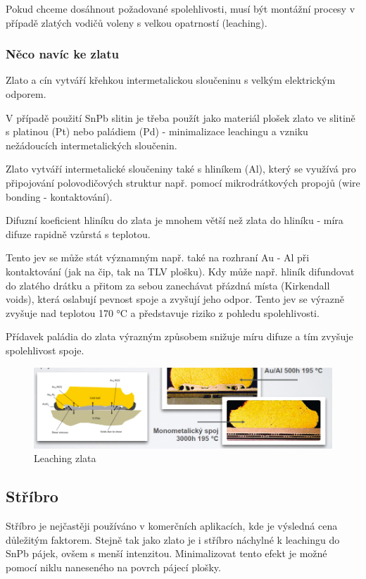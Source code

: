 Pokud chceme dosáhnout požadované spolehlivosti, musí být montážní procesy v případě
zlatých vodičů voleny s velkou opatrností (leaching).
\subsubsection{Něco navíc ke zlatu}
Zlato a cín vytváří křehkou intermetalickou sloučeninu s velkým elektrickým odporem.

V případě použití SnPb slitin je třeba použít jako materiál plošek zlato ve slitině s platinou (Pt) nebo paládiem (Pd) - minimalizace leachingu a vzniku nežádoucích intermetalických
sloučenin.

Zlato vytváří intermetalické sloučeniny také s hliníkem (Al), který se využívá pro připojování polovodičových struktur např. pomocí mikrodrátkových propojů (wire bonding -
kontaktování).

Difuzní koeficient hliníku do zlata je mnohem větší než zlata do hliníku - míra difuze rapidně
vzůrstá s teplotou.

Tento jev se může stát významným např. také na rozhraní Au - Al při kontaktování (jak na
čip, tak na TLV plošku). Kdy může např. hliník difundovat do zlatého drátku a přitom za
sebou zanechávat přázdná místa (Kirkendall voids), která oslabují pevnost spoje a zvyšují jeho odpor. Tento jev se výrazně zvyšuje nad teplotou 170 °C a představuje riziko z pohledu
spolehlivosti.

Přídavek paládia do zlata výrazným způsobem snižuje míru difuze a tím zvyšuje spolehlivost
spoje.

\begin{figure}[h]
   \begin{center}
     \includegraphics[scale=0.6]{images/Leach.png}
   \end{center}
   \caption{Leaching zlata}
\end{figure}

\subsection{Stříbro}
Stříbro je nejčastěji používáno v komerčních aplikacích, kde je výsledná cena důležitým faktorem. Stejně tak jako zlato je i stříbro náchylné k leachingu do SnPb pájek, ovšem s menší intenzitou. Minimalizovat tento efekt je možné pomocí niklu naneseného na povrch pájecí plošky.

